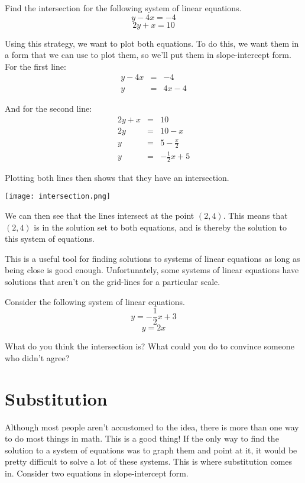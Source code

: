 \begin{example}
Find the intersection for the following system of linear equations.
$$y - 4x = -4$$
$$2y + x = 10$$

Using this strategy, we want to plot both equations.  To do this, we want them in a form that we can use to plot them, so we'll put them in slope-intercept form.
For the first line:
$$
\begin{array}{rcl}
y - 4x & = & -4 \\
y & = & 4x - 4 \end{array}$$

And for the second line:
$$\begin{array}{rcl}
2y + x & = & 10 \\
2y & = & 10 - x \\ 
y & = & 5 - \frac{x}{2} \\
y & = & - \frac{1}{2} x + 5 \end{array}$$

Plotting both lines then shows that they have an intersection.
\begin{center}
\texttt{[image: intersection.png]}	
\end{center}

We can then see that the lines intersect at the point $(2,4)$.  This means that $(2,4)$ is in the solution set to both equations, and is thereby the solution to this system of equations.
\end{example}

This is a useful tool for finding solutions to systems of linear equations as long as being close is good enough.  Unfortunately, some systems of linear equations have solutions that aren't on the grid-lines for a particular scale.

\begin{prblm}
Consider the following system of linear equations.
$$y = -\frac{1}{2}x + 3$$
$$y = 2x$$

What do you think the intersection is?  What could you do to convince someone who didn't agree?

\vspace{4cm}
\end{prblm}


\section{Substitution}

Although most people aren't accustomed to the idea, there is more than one way to do most things in math.  This is a good thing!  If the only way to find the solution to a system of equations was to graph them and point at it, it would be pretty difficult to solve a lot of these systems.  This is where substitution comes in.  Consider two equations in slope-intercept form.

